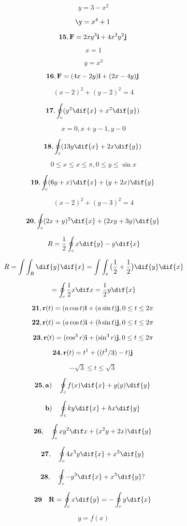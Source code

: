 \[ \ y =3-x^{2}\]

\[ \y =x^{4}+1 \]

\[ \bold{15}, \bold F= 2xy^{3}\bold i+4x^{2}y^{2}\bold j\]

\[ \ x=1\]

\[ \ y =x^{3}\]

\[ \bold{16},\bold F=(4x-2y)\bold i +(2x-4y)\bold j\]

\[ \ (x-2)^{2}+(y-2)^{2}=4 \]

\[ \bold {17}, \oint_{c}(y^{2}\dif{x}+x^{2}\dif{y})\]

\[ \ x=0,x+y-1,y-0\]

\[ \bold {18}, \oint_{c}(13y\dif{x}+2x\dif{y})\]

\[ \ 0\leq x \leq x \leq \pi, 0 \leq y\leq \sin x\]

\[\bold {19}, \oint_{c}(6y+x)\dif{x}+(y+2x)\dif{y}\]

\[ \ (x-2)^{2}+(y-3)^{2}=4\]

\[ \bold{20}, \oint _c(2x +y)^{2}\dif{x}+(2xy+3y)\dif {y}\]

\[ \ R=\frac{1}{2}\oint_{c}x\dif{y}-y\dif{x} \]

\[ \ R= \int\int_{R}\dif{y}\dif{x}=\int\int_{e}\big(\frac{1}{2}+\frac{1}{2}\big)\dif{y}\dif{x}\]

\[ \ = \oint_{c}\frac{1}{2}x\dif x=\frac{1}{2}y\dif{x}\]

\[ \bold{21},\bold r(t)= (a\cos t)\bold i+(a \sin t)\bold j, 0\leq t \leq 2\pi \]

\[ \bold {22},\bold r(t) =  (a\cos t)\bold i+(b \sin t)\bold j, 0\leq t \leq 2\pi \]

\[ \bold {23},\bold r(t)=(\cos^{3}r)\bold i +(\sin^{3}r)\bold j,0\leq t \leq 2\pi \]

\[ \bold {24}, \bold r(t)= t^{1}+((t^{3}/3)-t)\bold j\]

\[ -\sqrt{3}\leq t\leq \sqrt{3}\]

\[ \bold{25}, \bold a)\quad \oint_{c}f(x)\dif{x}+g(y)\dif{y}\]

\[ \bold b) \quad \oint_{c}ky\dif{x}+hx\dif{y}\]

\[ \bold {26}, \quad \oint_{c}xy^{2}\dif x +(x^{2}y+2x)\dif {y}\]

\[ \bold {27}, \quad \oint_{c}4x^{3}y\dif{x}+x^{2}\dif {y}\]

\[ \bold{28}, \quad \oint_{c}-y^{3}\dif{x}+x^{3}\dif{y}?\]

\[ \bold {29} \quad \bold R= \oint_{c}x\dif{y}= -\oint_{c}y\dif{x}\]

\[ \ y=f(x)\]

